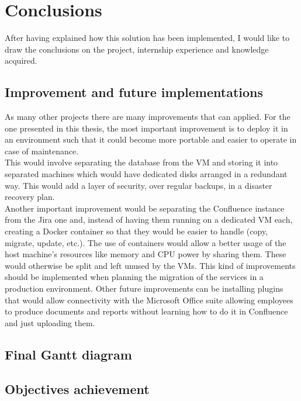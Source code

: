 \chapter{Conclusions}
\label{conclusions}

After having explained how this solution has been implemented, I would like to draw the conclusions on the project, internship experience and knowledge acquired.

\section{Improvement and future implementations}
	As many other projects there are many improvements that can applied.
	For the one presented in this thesis, the most important improvement is to deploy it in an environment such that it could become more portable and easier to operate in case of maintenance.\\
	This would involve separating the database from the VM and storing it into separated machines which would have dedicated disks arranged in a redundant way.
	This would add a layer of security, over regular backups, in a disaster recovery plan.\\
	Another important improvement would be separating the Confluence instance from the Jira one and, instead of having them running on a dedicated VM each, creating a Docker container so that they would be easier to handle (copy, migrate, update, etc.).
	The use of containers would allow a better usage of the host machine's resources like memory and CPU power by sharing them.
	These would otherwise be split and left unused by the VMs.
	This kind of improvements should be implemented when planning the migration of the services in a production environment.
	Other future improvements can be installing plugins that would allow connectivity with the Microsoft Office suite allowing employees to produce documents and reports without learning how to do it in Confluence and just uploading them.

\section{Final Gantt diagram}
%	
\section{Objectives achievement}

